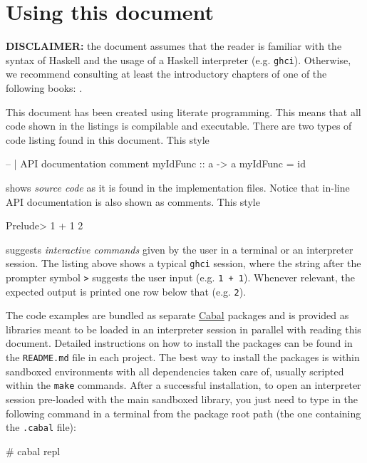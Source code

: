 \section{Using this document}
\label{sec:using-this-document}

\textbf{DISCLAIMER:} the document assumes that the reader is familiar with the syntax of Haskell and the usage of a Haskell interpreter (e.g. \texttt{ghci}). Otherwise, we recommend consulting at least the introductory chapters of one of the following books: \cite{Lipovaca11,Hutton07}.

This document has been created using literate programming. This means that all code shown in the listings is compilable and executable. There are two types of code listing found in this document. This style
\begin{code}
-- | API documentation comment 
myIdFunc :: a -> a
myIdFunc = id
\end{code}
shows \emph{source code} as it is found in the implementation files. Notice that in-line API documentation is also shown as comments. This style
\begin{interactive}
Prelude> 1 + 1
2
\end{interactive}
suggests \emph{interactive commands} given by the user in a terminal or an interpreter session. The listing above shows a typical \texttt{ghci} session, where the string after the prompter symbol \texttt{>} suggests the user input (e.g. \texttt{1 + 1}). Whenever relevant, the expected output is printed one row below that (e.g. \texttt{2}).

The code examples are bundled as separate \href{https://www.haskell.org/cabal/}{Cabal} packages and is provided as libraries meant to be loaded in an interpreter session in parallel with reading this document. Detailed instructions on how to install the packages can be found in the \texttt{README.md} file in each project. The best way to install the packages is within sandboxed environments with all dependencies taken care of, usually scripted within the \texttt{make} commands. After a successful installation, to open an interpreter session pre-loaded with the main sandboxed library, you just need to type in the following command in a terminal from the package root path (the one containing the \texttt{.cabal} file):
\begin{interactive}
# cabal repl
\end{interactive}

